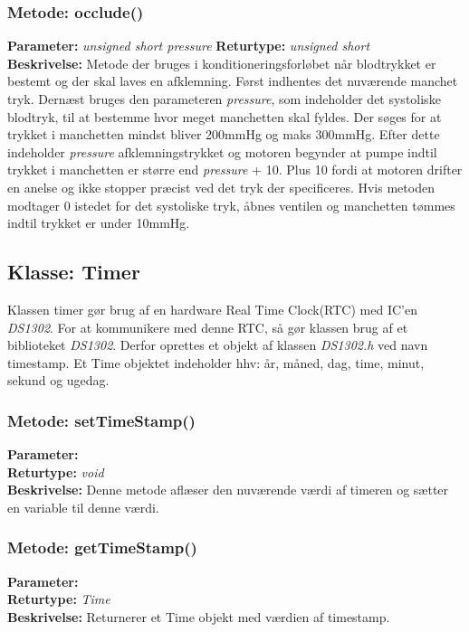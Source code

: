 \subsubsection{Metode: occlude()}
\textbf{Parameter: } \textit{unsigned short pressure}
\textbf{Returtype: } \textit{unsigned short}\\
\textbf{Beskrivelse: }Metode der bruges i konditioneringsforløbet når blodtrykket er bestemt og der skal laves en afklemning. Først indhentes det nuværende manchet tryk. Dernæst bruges den parameteren \textit{pressure}, som indeholder det systoliske blodtryk, til at bestemme hvor meget manchetten skal fyldes. Der søges for at trykket i manchetten mindst bliver 200mmHg og maks 300mmHg. Efter dette indeholder \textit{pressure}  afklemningstrykket og motoren begynder at pumpe indtil trykket i manchetten er større end \textit{pressure} + 10. Plus 10 fordi at motoren drifter en anelse og ikke stopper præcist ved det tryk der specificeres. 
Hvis metoden modtager 0 istedet for det systoliske tryk, åbnes ventilen og manchetten tømmes indtil trykket er under 10mmHg. 


\subsection{Klasse: Timer}
Klassen timer gør brug af en hardware Real Time Clock(RTC) med IC’en \textit{DS1302}. For at kommunikere med denne RTC, så gør klassen brug af et biblioteket \textit{DS1302}. Derfor oprettes et objekt af klassen \textit{DS1302.h} ved navn timestamp. Et Time objektet indeholder hhv: år, måned, dag, time, minut, sekund og ugedag. 

\subsubsection{Metode: setTimeStamp()}
\textbf{Parameter: } 
\\ \textbf{Returtype: } \textit{void}
\\ \textbf{Beskrivelse: } Denne metode aflæser den nuværende værdi af timeren og sætter en variable til denne værdi. 

\subsubsection{Metode: getTimeStamp()}
\textbf{Parameter: } 
\\ \textbf{Returtype: } \textit{Time}
\\ \textbf{Beskrivelse: } Returnerer et Time objekt med værdien af timestamp. 

